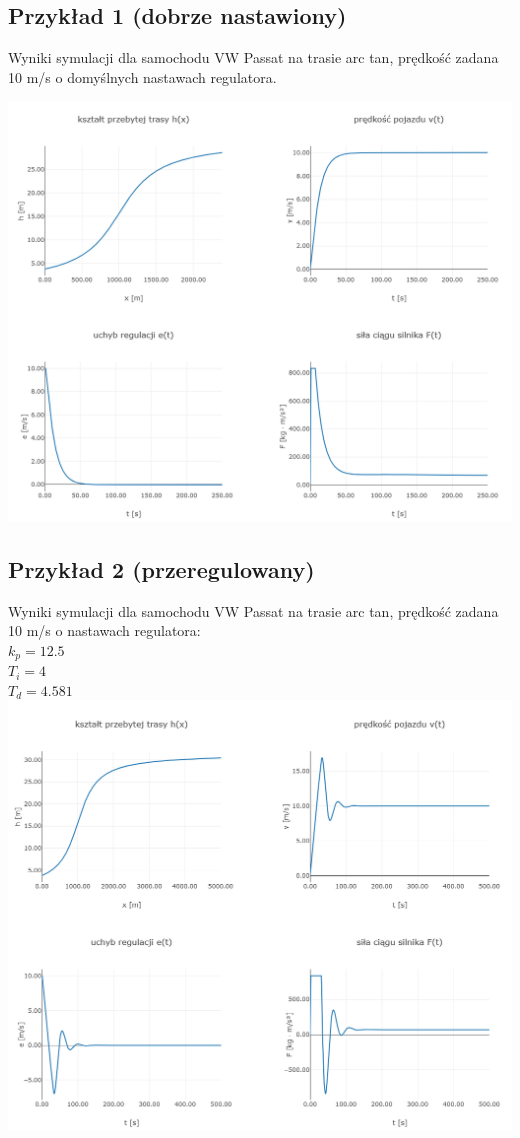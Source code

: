 \documentclass[12pt,a4paper]{article}
\begin{document}
	\subsection{Przykład 1 (dobrze nastawiony)}
	Wyniki symulacji dla samochodu VW Passat na trasie arc tan, prędkość zadana 10 m/s o domyślnych nastawach regulatora.
	
	\includegraphics[width=0.9\linewidth]{"zrzut 1.png"}
	\newpage
	\subsection{Przykład 2 (przeregulowany)}
	Wyniki symulacji dla samochodu VW Passat na trasie arc tan, prędkość zadana 10 m/s o nastawach regulatora: \\
	$k_p = 12.5$ \\
	$T_i = 4$ \\
	$T_d = 4.581$ \\
	
	\includegraphics[width=0.9\linewidth]{"zrzut 2.png"}
	\newpage
\end{document}
